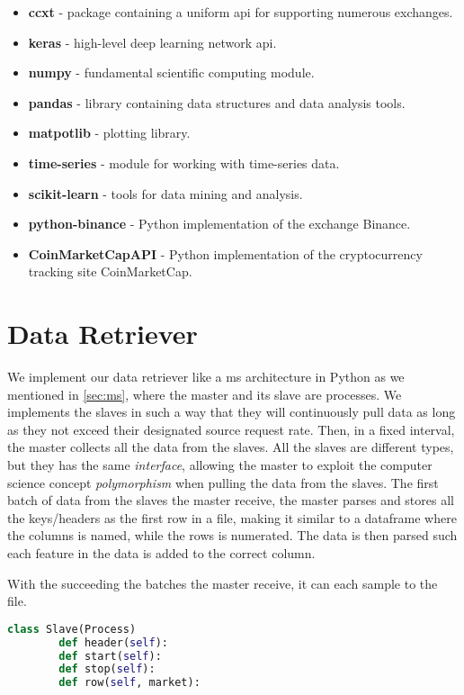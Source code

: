 \begin{itemize}
    \item \textbf{ccxt} - package containing a uniform \ac{api} for supporting numerous exchanges.
    \item \textbf{keras} - high-level deep learning network \ac{api}.
    \item \textbf{numpy} - fundamental scientific computing module.
    \item \textbf{pandas} - library containing data structures and data analysis tools.
    \item \textbf{matpotlib} - plotting library.
    \item \textbf{time-series} - module for working with time-series data.  
    \item \textbf{scikit-learn} - tools for data mining and analysis.
    \item \textbf{python-binance} - Python implementation of the exchange Binance.
    \item \textbf{CoinMarketCapAPI} - Python implementation of the cryptocurrency tracking site CoinMarketCap.
\end{itemize}

\section{Data Retriever}
We implement our data retriever like a \ac{ms} architecture in Python as we mentioned in \autoref{sec:ms}, where the master and its slave are processes. We implements the slaves in such a way that they will continuously pull data as long as they not exceed their designated source request rate. Then, in a fixed interval, the master collects all the data from the slaves. All the slaves are different types, but they has the same \emph{interface}, allowing the master to exploit the computer science concept \emph{polymorphism} when pulling the data from the slaves. The first batch of data from the slaves the master receive, the master parses and stores all the keys/headers as the first row in a file, making it similar to a dataframe where the columns is named, while the rows is numerated. The data is then parsed such each feature in the data is added to the correct column.

With the succeeding the batches the master receive, it can each sample to the file.

\begin{lstlisting}[language=Python, caption={Slave interface}, label=code:interface]
    class Slave(Process)
        def header(self):
        def start(self):
        def stop(self):
        def row(self, market):
\end{lstlisting}


